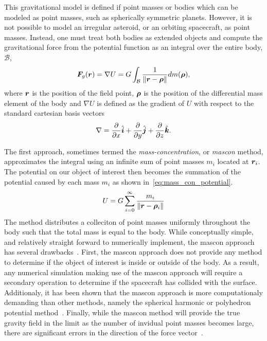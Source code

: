 This gravitational model is defined if point masses or bodies which can be modeled as point masses, such as spherically symmetric planets.
However, it is not possible to model an irregular asteroid, or an orbiting spacecraft, as point masses.
Instead, one must treat both bodies as extended objects and compute the gravitational force from the potential function as an integral over the entire body, \( \mathcal{B}\),
\begin{align}\label{eq:volume_integral_potential}
\bm{F}_g ( \bm{r}) = \nabla U = G \int_{\mathcal{B}} \frac{1}{\left\| \bm{r} - \bm{\rho}  \right\|} dm (\bm{\rho}),
\end{align}
where \( \bm{r} \) is the position of the field point, \( \bm{\rho} \) is the position of the differential mass element of the body and \( \nabla U \) is defined as the gradient of \( U \) with respect to the standard cartesian basis vectors
\begin{align*}
    \nabla = \frac{\partial }{\partial x} \hat{\bm{i}} + \frac{\partial }{\partial y} \hat{\bm{j}} + \frac{\partial }{\partial z} \hat{\bm{k}}.
\end{align*}

The first approach, sometimes termed the \textit{mass-concentration}, or \textit{mascon} method, approximates the integral using an infinite sum of point masses \( m_i\) located at \( \bm{r}_i \).
The potential on our object of interest then becomes the summation of the potential caused by each mass \( m_i \) as shown in~\cref{eq:mass_con_potential}.
\begin{align}\label{eq:mass_con_potential}
    U = G \sum_{i=0}^{\infty} \frac{m_i}{\left\| \bm{r} - \bm{\rho}_i \right\|}
\end{align}
The method distributes a colleciton of point masses uniformly throughout the body such that the total mass is equal to the body.
While conceptually simple, and relatively straight forward to numerically implement, the mascon approach has several drawbacks~\cite{scheeres2012a}.
First, the mascon approach does not provide any method to determine if the object of interest is inside or outside of the body.
As a result, any numerical simulation making use of the mascon approach will require a secondary operation to determine if the spacecraft has collided with the surface.
Additionaly, it has been shown that the mascon approach is more computationaly demanding than other methods, namely the spherical harmonic or polyhedron potential method~\cite{werner1996}.
Finally, while the mascon method will provide the true gravity field in the limit as the number of invidual point masses becomes large, there are significant errors in the direction of the force vector~\cite{werner1996}.

